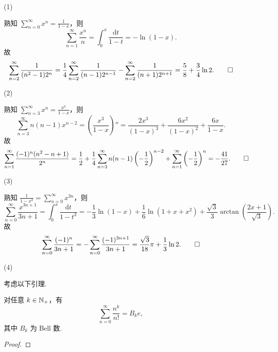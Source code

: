 \begin{enumerate}
    \item[(1)]
    \begin{solution}
        熟知 $\sum_{n=0}^{\infty} x^n = \frac 1 {1-x}$，则
        \[
            \sum_{n=1}^{\infty} \frac {x^n} n = \int_0^x \frac{\mathrm dt}{1-t} = -\ln(1-x).
        \]
        故
        \[
            \sum_{n=2}^{\infty} \frac 1 {(n^2-1) 2^n} = \frac 1 4 \sum_{n=2}^{\infty} \frac 1 {(n-1) 2^{n-1}} - \sum_{n=2}^{\infty} \frac 1 {(n+1) 2^{n+1}} = \frac 5 8 + \frac 3 4 \ln 2. \qedhere
        \]
    \end{solution}
    \item[(2)]
    \begin{solution}
        熟知 $\sum_{n=3}^{\infty} x^n = \frac{x^3}{1-x}$，则
        \[
            \sum_{n=3}^{\infty} n(n-1) x^{n-2} = \left( \frac{x^3}{1-x} \right)'' = \frac{2x^3}{(1-x)^3} + \frac{6x^2}{(1-x)^2} + \frac{6x}{1-x}.
        \]
        故
        \[
            \sum_{n=1}^{\infty} \frac{(-1)^n (n^2-n+1)}{2^n} = \frac 1 2 + \frac 1 4 \sum_{n=3}^{\infty} n(n-1) \left( - \frac 1 2 \right)^{n-2} + \sum_{n=1}^{\infty} \left( -\frac 1 2 \right)^n = -\frac{41}{27}. \qedhere
        \]
    \end{solution}
    \item[(3)]
    \begin{solution}
        熟知 $\frac 1 {1-x^3} = \sum_{n=0}^{\infty} x^{3n}$，则
        \[
            \sum_{n=0}^{\infty} \frac{x^{3n+1}}{3n+1} = \int_0^x \frac{\mathrm dt}{1-t^3} = -\frac 1 3 \ln(1-x) + \frac 1 6 \ln(1 + x + x^2) + \frac {\sqrt 3} 3 \arctan\left( \frac{2x + 1}{\sqrt 3} \right).
        \]
        故
        \[
            \sum_{n=0}^{\infty} \frac{(-1)^n}{3n+1} = - \sum_{n=0}^{\infty} \frac{(-1)^{3n+1}}{3n+1} = \frac{\sqrt 3}{18} \pi + \frac 1 3 \ln 2. \qedhere
        \]
    \end{solution}
    \item[(4)]
    \begin{solution}
        考虑以下引理.
        \begin{center}
            \begin{minipage}{0.85\textwidth}
                \begin{lemma}{}{}
                    对任意 $k \in \mathbb N_+$，有
                    \[
                        \sum_{n=0}^\infty \frac{n^k}{n!} = B_k e,
                    \]
                    其中 $B_k$ 为 Bell 数.
                    \tcblower
                    \begin{proof}

\end{proof}
\end{lemma}
\end{minipage}
\end{center}
\end{solution}
\end{enumerate}
